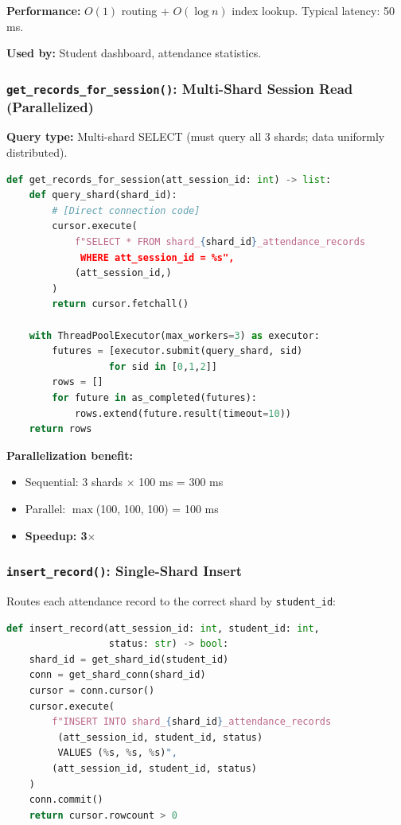 \documentclass[conference]{IEEEtran}
\begin{document}
\textbf{Performance:} $O(1)$ routing + $O(\log n)$ index lookup. Typical latency: 50 ms.

\textbf{Used by:} Student dashboard, attendance statistics.

\subsubsection{\texttt{get\_records\_for\_session()}: Multi-Shard Session Read (Parallelized)}

\textbf{Query type:} Multi-shard SELECT (must query all 3 shards; data uniformly distributed).

\begin{lstlisting}[language=Python]
def get_records_for_session(att_session_id: int) -> list:
    def query_shard(shard_id):
        # [Direct connection code]
        cursor.execute(
            f"SELECT * FROM shard_{shard_id}_attendance_records 
             WHERE att_session_id = %s",
            (att_session_id,)
        )
        return cursor.fetchall()
    
    with ThreadPoolExecutor(max_workers=3) as executor:
        futures = [executor.submit(query_shard, sid) 
                  for sid in [0,1,2]]
        rows = []
        for future in as_completed(futures):
            rows.extend(future.result(timeout=10))
    return rows
\end{lstlisting}

\textbf{Parallelization benefit:}
\begin{itemize}
    \item Sequential: 3 shards $\times$ 100 ms = 300 ms
    \item Parallel: $\max$(100, 100, 100) = 100 ms
    \item \textbf{Speedup: 3$\times$}
\end{itemize}

\subsubsection{\texttt{insert\_record()}: Single-Shard Insert}

Routes each attendance record to the correct shard by \texttt{student\_id}:

\begin{lstlisting}[language=Python]
def insert_record(att_session_id: int, student_id: int,
                  status: str) -> bool:
    shard_id = get_shard_id(student_id)
    conn = get_shard_conn(shard_id)
    cursor = conn.cursor()
    cursor.execute(
        f"INSERT INTO shard_{shard_id}_attendance_records
         (att_session_id, student_id, status)
         VALUES (%s, %s, %s)",
        (att_session_id, student_id, status)
    )
    conn.commit()
    return cursor.rowcount > 0
\end{lstlisting}
\end{document}
